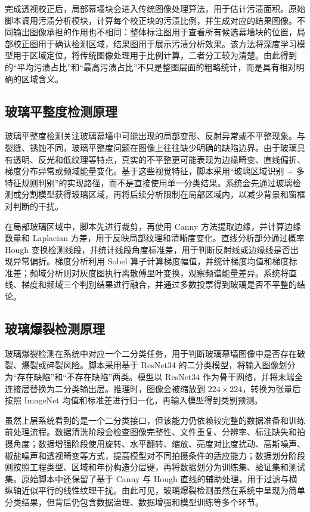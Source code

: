 完成透视校正后，局部幕墙块会进入传统图像处理算法，用于估计污渍面积。原始脚本调用污渍分析模块，计算每个校正块的污渍比例，并生成对应的结果图像。不同输出图像承担的作用也不相同：整体标注图用于查看所有候选幕墙块的位置，局部校正图用于确认检测区域，结果图用于展示污渍分析效果。该方法将深度学习模型用于区域定位，将传统图像处理用于比例计算，二者分工较为清楚。由此得到的“平均污渍占比”和“最高污渍占比”不只是整图层面的粗略统计，而是具有相对明确的区域含义。

\subsection{玻璃平整度检测原理}
\label{sec:foundation-glass-flatness-detection-principle}

玻璃平整度检测关注玻璃幕墙中可能出现的局部变形、反射异常或不平整现象。与裂缝、锈蚀不同，玻璃平整度问题在图像上往往缺少明确的缺陷边界。由于玻璃具有透明、反光和低纹理等特点，真实的不平整更可能表现为边缘畸变、直线偏折、梯度分布异常或频域能量变化。基于这些视觉特征，脚本采用“玻璃区域识别 + 多特征规则判别”的实现路径，而不是直接使用单一分类结果。系统会先通过玻璃检测或分割模型获得玻璃区域，再将后续分析限制在局部区域内，以减少背景和窗框对判断的干扰。

在局部玻璃区域中，脚本先进行裁剪，再使用 Canny 方法提取边缘，并计算边缘数量和 Laplacian 方差，用于反映局部纹理和清晰度变化\cite{canny1986edge}。直线分析部分通过概率 Hough 变换检测线段，并统计线段角度标准差，用于判断反射线或边缘线是否出现异常偏折\cite{duda1972hough}。梯度分析利用 Sobel 算子计算梯度幅值，并统计梯度均值和梯度标准差；频域分析则对灰度图执行离散傅里叶变换，观察频谱能量差异。系统将直线、梯度和频域三个判别结果进行融合，并通过多数投票得到玻璃是否不平整的结论。

\subsection{玻璃爆裂检测原理}
\label{sec:foundation-glass-spalling-detection-principle}

玻璃爆裂检测在系统中对应一个二分类任务，用于判断玻璃幕墙图像中是否存在破裂、爆裂或碎裂风险。脚本采用基于 ResNet34 的二分类模型，将输入图像划分为“存在缺陷”和“不存在缺陷”两类。模型以 ResNet34 作为骨干网络，并将末端全连接层替换为二分类输出层。推理时，图像会被缩放到 $224\times224$，转换为张量后按照 ImageNet 均值和标准差进行归一化，再输入模型得到类别预测。

虽然上层系统看到的是一个二分类接口，但该能力仍依赖较完整的数据准备和训练前处理流程。数据清洗阶段会检查图像完整性、文件重复、分辨率、标注缺失和拍摄角度；数据增强阶段使用旋转、水平翻转、缩放、亮度对比度扰动、高斯噪声、椒盐噪声和透视畸变等方式，提高模型对不同拍摄条件的适应能力；数据划分阶段则按照工程类型、区域和年份构造分层键，再将数据划分为训练集、验证集和测试集。原始脚本中还保留了基于 Canny 与 Hough 直线的辅助处理，用于过滤与横纵轴近似平行的线性纹理干扰。由此可见，玻璃爆裂检测虽然在系统中呈现为简单分类结果，但背后仍包含数据治理、数据增强和模型训练等多个环节。

